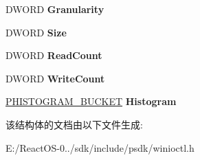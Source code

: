 \begin{DoxyCompactItemize}
\item 
\mbox{\label{struct___d_i_s_k___h_i_s_t_o_g_r_a_m_a09b9a6cb5015cc775e8af28c0d88b987}} 
D\+W\+O\+RD {\bfseries Granularity}
\item 
\mbox{\label{struct___d_i_s_k___h_i_s_t_o_g_r_a_m_a543674fb617fb7e743497ba741ce640a}} 
D\+W\+O\+RD {\bfseries Size}
\item 
\mbox{\label{struct___d_i_s_k___h_i_s_t_o_g_r_a_m_abe327c9e1d33b9f3ad909797b8f95ff6}} 
D\+W\+O\+RD {\bfseries Read\+Count}
\item 
\mbox{\label{struct___d_i_s_k___h_i_s_t_o_g_r_a_m_a37c0c353b31adc505b9761bf6d29f4d7}} 
D\+W\+O\+RD {\bfseries Write\+Count}
\item 
\mbox{\label{struct___d_i_s_k___h_i_s_t_o_g_r_a_m_a8759dd3827bc5faf6b03b8a89958f39b}} 
\hyperlink{struct___h_i_s_t_o_g_r_a_m___b_u_c_k_e_t}{P\+H\+I\+S\+T\+O\+G\+R\+A\+M\+\_\+\+B\+U\+C\+K\+ET} {\bfseries Histogram}
\end{DoxyCompactItemize}


该结构体的文档由以下文件生成\+:\begin{DoxyCompactItemize}
\item 
E\+:/\+React\+O\+S-\/0../sdk/include/psdk/winioctl.\+h\end{DoxyCompactItemize}
